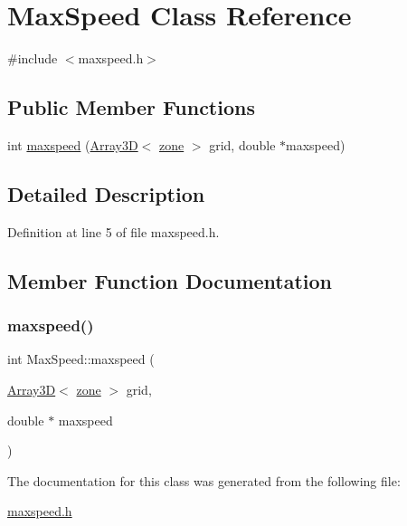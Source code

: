 \hypertarget{classMaxSpeed}{}\section{Max\+Speed Class Reference}
\label{classMaxSpeed}


{\ttfamily \#include $<$maxspeed.\+h$>$}

\subsection*{Public Member Functions}
\begin{DoxyCompactItemize}
\item 
int \hyperlink{classMaxSpeed_a3a310add69cc09dfe5a6c729e09200ef}{maxspeed} (\hyperlink{classTNT_1_1Array3D}{Array3D}$<$ \hyperlink{structzone}{zone} $>$ grid, double $\ast$maxspeed)
\end{DoxyCompactItemize}


\subsection{Detailed Description}


Definition at line 5 of file maxspeed.\+h.



\subsection{Member Function Documentation}
\mbox{\label{classMaxSpeed_a3a310add69cc09dfe5a6c729e09200ef}} 
\subsubsection{\texorpdfstring{maxspeed()}{maxspeed()}}
{\footnotesize\ttfamily int Max\+Speed\+::maxspeed (\begin{DoxyParamCaption}\item[{\hyperlink{classTNT_1_1Array3D}{Array3D}$<$ \hyperlink{structzone}{zone} $>$}]{grid,  }\item[{double $\ast$}]{maxspeed }\end{DoxyParamCaption})}



The documentation for this class was generated from the following file\+:\begin{DoxyCompactItemize}
\item 
\hyperlink{maxspeed_8h}{maxspeed.\+h}\end{DoxyCompactItemize}
